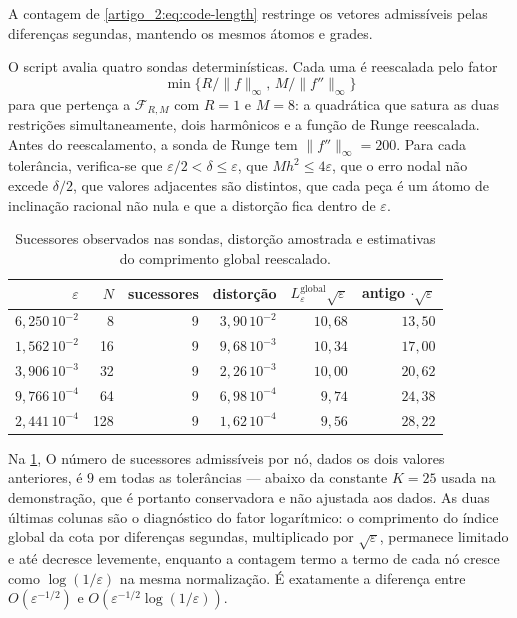 A contagem de \eqref{artigo_2:eq:code-length} restringe os vetores admissíveis pelas diferenças segundas, mantendo os mesmos átomos e grades.

O script avalia quatro sondas determinísticas. Cada uma é reescalada pelo fator
\[\min\{R/\|f\|_\infty,\,M/\|f''\|_\infty\}\]
para que pertença a
$\mathcal F_{R,M}$ com $R=1$ e $M=8$: a quadrática que satura as duas
restrições simultaneamente, dois harmônicos e a função de Runge reescalada.
Antes do reescalamento, a sonda de Runge tem $\|f''\|_\infty=200$. Para cada tolerância, verifica-se que
$\varepsilon/2<\delta\le\varepsilon$, que $Mh^2\le4\varepsilon$, que o erro
nodal não excede $\delta/2$, que valores adjacentes são distintos, que cada
peça é um átomo de inclinação racional não nula e que a distorção fica dentro
de $\varepsilon$.

\begin{table}[t]
\centering
\caption{Sucessores observados nas sondas, distorção amostrada e estimativas do comprimento global reescalado.}
\label{artigo_2:tab:codebook-pt}
\small
\begin{tabular}{rrrrrr}
\toprule
$\varepsilon$ & $N$ & sucessores & distorção & $L_\varepsilon^{\mathrm{global}}\sqrt{\varepsilon}$ & antigo $\cdot\sqrt{\varepsilon}$\\
\midrule
$6{,}250\,10^{-2}$ & 8   & 9 & $3{,}90\,10^{-2}$ & $10{,}68$ & $13{,}50$\\
$1{,}562\,10^{-2}$ & 16  & 9 & $9{,}68\,10^{-3}$ & $10{,}34$ & $17{,}00$\\
$3{,}906\,10^{-3}$ & 32  & 9 & $2{,}26\,10^{-3}$ & $10{,}00$ & $20{,}62$\\
$9{,}766\,10^{-4}$ & 64  & 9 & $6{,}98\,10^{-4}$ & $9{,}74$  & $24{,}38$\\
$2{,}441\,10^{-4}$ & 128 & 9 & $1{,}62\,10^{-4}$ & $9{,}56$  & $28{,}22$\\
\bottomrule
\end{tabular}
\end{table}

Na \cref{artigo_2:tab:codebook-pt}, O número de sucessores
admissíveis por nó, dados os dois valores anteriores, é $9$ em todas as
tolerâncias --- abaixo da constante $K=25$ usada na demonstração, que é
portanto conservadora e não ajustada aos dados. As duas últimas colunas são o
diagnóstico do fator logarítmico: o comprimento do índice global da cota por diferenças segundas,
multiplicado por $\sqrt{\varepsilon}$, permanece limitado e até decresce
levemente, enquanto a contagem termo a termo de cada nó cresce
como $\log(1/\varepsilon)$ na mesma normalização. É exatamente a diferença
entre $O(\varepsilon^{-1/2})$ e $O(\varepsilon^{-1/2}\log(1/\varepsilon))$.



